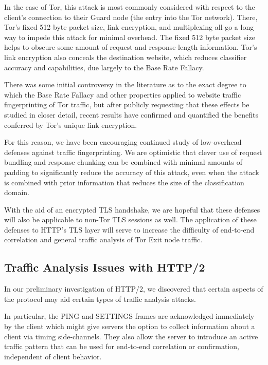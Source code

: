 \documentclass[letterpaper,11pt]{llncs}
\begin{document}
In the case of Tor, this attack is most commonly considered with respect to
the client's connection to their Guard node (the entry into the Tor network).
There, Tor's fixed 512 byte packet size, link encryption, and multiplexing all
go a long way to impede this attack for minimal overhead. The fixed 512 byte
packet size helps to obscure some amount of request and response length
information. Tor's link encryption also conceals the destination website,
which reduces classifier accuracy and capabilities, due largely to the Base
Rate Fallacy.

There was some initial controversy in the literature as to the exact degree to
which the Base Rate Fallacy and other properties applied to website traffic
fingerprinting of Tor traffic, but after publicly requesting that these
effects be studied in closer detail, recent results have confirmed and
quantified the benefits conferred by Tor's unique link encryption.

For this reason, we have been encouraging continued study of low-overhead
defenses against traffic fingerprinting. We are optimistic that clever use of
request bundling and response chunking can be combined with minimal amounts of
padding to significantly reduce the accuracy of this attack, even when the
attack is combined with prior information that reduces the size of the
classification domain.

With the aid of an encrypted TLS handshake, we are hopeful that these defenses
will also be applicable to non-Tor TLS sessions as well. The application of
these defenses to HTTP's TLS layer will serve to increase the difficulty
of end-to-end correlation and general traffic analysis of Tor Exit node
traffic.

\subsection{Traffic Analysis Issues with HTTP/2}

In our preliminary investigation of HTTP/2, we discovered that certain aspects
of the protocol may aid certain types of traffic analysis attacks.

In particular, the PING and SETTINGS frames are acknowledged immediately by
the client which might give servers the option to collect information about a
client via timing side-channels. They also allow the server to introduce an
active traffic pattern that can be used for end-to-end correlation or
confirmation, independent of client behavior.
\end{document}
